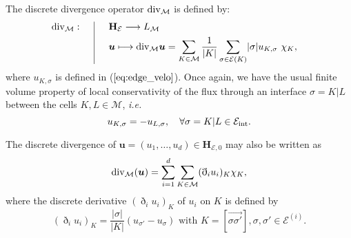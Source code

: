 \documentclass{amsart}
\numberwithin{equation}{section}
\begin{document}
\medskip
{}
 The discrete divergence operator ${{\rm div}}_{{\mathcal M}}$ is defined by:
\begin{align} \label{eq:div}
  &\begin{array}{l| l} \displaystyle
    {{\rm div}}_{{\mathcal M}}: \quad & \quad {{\mathbf{H}_{{\mathcal E}}}}\longrightarrow L_{{\mathcal M}}
		\\ [1ex] & \displaystyle \quad {{\boldsymbol u}} \longmapsto {{\rm div}}_{{\mathcal M}} {{\boldsymbol u}}  =  \sum_{K\in{{\mathcal M}}} \frac 1 {|K|} \sum_{{{\sigma}}\in{{\mathcal E}}(K)} \! {\vert {{\sigma}} \vert} {u_{K,{{\sigma}}}} \ \chi_K,
  \end{array}
\end{align}
where $u_{K,{{\sigma}}} $ is defined in ($\ref{eq:edge_velo}$). 
Once again, we have the usual finite volume property of local conservativity of the flux through an interface ${{\sigma}}=K|L$ between the cells  $K,L\in{{\mathcal M}}$, {\emph{i.e.\/}} \
\begin{equation}
  \label{conservativite}
  u_{K,{{\sigma}}} =-u_{L,{{\sigma}}} ,\quad\forall {{\sigma}}=K|L\in{{\mathcal E}_{\rm int}} .
\end{equation}

The discrete divergence of ${{\boldsymbol u}} = (u_1, \ldots, u_d) \in {{\mathbf{H}_{{{\mathcal E}},0}}}$   may also be written as
\begin{equation}
    {{\rm div}}_{{\mathcal M}}({{\boldsymbol u}}) = \sum_{i=1}^d {\sum_{K \in {\mathcal{M}} }} (\eth_i u_i)_K \chi_K,
\end{equation}
where the discrete derivative $(\eth_i u_i)_K$ of $u_i$ on $K$ is defined by 
\begin{equation}
   (\eth_i u_i)_K = \frac{\vert {{\sigma}} \vert} {\vert K \vert}(u_{{{\sigma}}'} - u_{{\sigma}})  \mbox{ with } K = [\overrightarrow{{{\sigma}} {{\sigma}}'}], {{\sigma}}, {{\sigma}}' \in {\mathcal {E}^{(i)}}.   \label{discrete-derivative-i-ui}
\end{equation}
\end{document}

